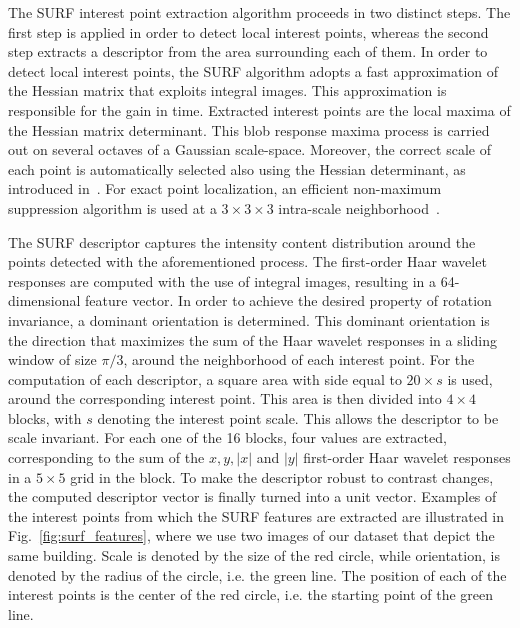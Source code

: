 The SURF interest point extraction algorithm proceeds in two distinct steps. The first step is applied in order to detect local interest points, whereas the second step extracts a descriptor from the area surrounding each of them. In order to detect local interest points, the SURF algorithm adopts a fast approximation of the Hessian matrix that exploits integral images. This approximation is responsible for the gain in time. Extracted interest points are the local maxima of the Hessian matrix determinant. This blob response maxima process is carried out on several octaves of a Gaussian scale-space. Moreover, the correct scale of each point is automatically selected also using the Hessian determinant, as introduced in~\cite{lindeberg1994linear}. For exact point localization, an efficient non-maximum suppression algorithm is used at a $3\times 3\times 3$ intra-scale neighborhood~\cite{neubeck2006efficient}.

The SURF descriptor captures the intensity content distribution around the points detected with the aforementioned process. The first-order Haar wavelet responses are computed with the use of integral images, resulting in a 64-dimensional feature vector. In order to achieve the desired property of rotation invariance, a dominant orientation is determined. This dominant orientation is the direction that maximizes the sum of the Haar wavelet responses in a sliding window of size $\pi /3$, around the neighborhood of each interest point. For the computation of each descriptor, a square area with side equal to $20\times s$ is used, around the corresponding interest point. This area is then divided into $4\times 4$ blocks, with $s$ denoting the interest point scale. This allows the descriptor to be scale invariant. For each one of the 16 blocks, four values are extracted, corresponding to the sum of the $x, y, |x|$ and $|y|$ first-order Haar wavelet responses in a $5\times 5$ grid in the block. To make the descriptor robust to contrast changes, the computed descriptor vector is finally turned into a unit vector.
Examples of the interest points from which the SURF features are extracted are illustrated in Fig.~\ref{fig:surf_features}, where we use two images of our dataset that depict the same building. Scale is denoted by the size of the red circle, while orientation, is denoted by the radius of the circle, i.e. the green line. The position of each of the interest points is the center
of the red circle, i.e. the starting point of the green line.


